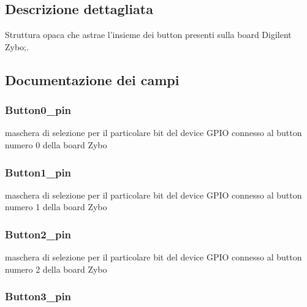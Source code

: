 \subsection{Descrizione dettagliata}
Struttura opaca che astrae l'insieme dei button presenti sulla board Digilent Zybo;. 

\subsection{Documentazione dei campi}
\hypertarget{struct_zybo_button__t_af7d7d5a9c9fc174e8f4ee4c762c2abee}{
\subsubsection[{Button0\+\_\+pin}]{ Button0\+\_\+pin}}\label{struct_zybo_button__t_af7d7d5a9c9fc174e8f4ee4c762c2abee}
maschera di selezione per il particolare bit del device G\+P\+I\+O connesso al button numero 0 della board Zybo \hypertarget{struct_zybo_button__t_a6cb60bb285e32e29c51c15e85206aaeb}{
\subsubsection[{Button1\+\_\+pin}]{ Button1\+\_\+pin}}\label{struct_zybo_button__t_a6cb60bb285e32e29c51c15e85206aaeb}
maschera di selezione per il particolare bit del device G\+P\+I\+O connesso al button numero 1 della board Zybo \hypertarget{struct_zybo_button__t_a3b4fe634c2d98ce55fdef526c2d230d1}{
\subsubsection[{Button2\+\_\+pin}]{ Button2\+\_\+pin}}\label{struct_zybo_button__t_a3b4fe634c2d98ce55fdef526c2d230d1}
maschera di selezione per il particolare bit del device G\+P\+I\+O connesso al button numero 2 della board Zybo \hypertarget{struct_zybo_button__t_ad462a15a55883fd4c86d2be9e11968a7}{
\subsubsection[{Button3\+\_\+pin}]{ Button3\+\_\+pin}}\label{struct_zybo_button__t_ad462a15a55883fd4c86d2be9e11968a7}
